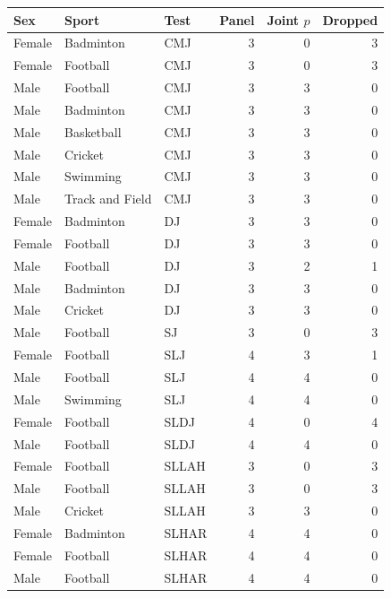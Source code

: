 \begin{tabular}{lllrrr}
\toprule
Sex & Sport & Test & Panel & Joint $p$ & Dropped \\
\midrule
Female & Badminton & CMJ & 3 & 0 & 3 \\
Female & Football & CMJ & 3 & 0 & 3 \\
Male & Football & CMJ & 3 & 3 & 0 \\
Male & Badminton & CMJ & 3 & 3 & 0 \\
Male & Basketball & CMJ & 3 & 3 & 0 \\
Male & Cricket & CMJ & 3 & 3 & 0 \\
Male & Swimming & CMJ & 3 & 3 & 0 \\
Male & Track and Field & CMJ & 3 & 3 & 0 \\
Female & Badminton & DJ & 3 & 3 & 0 \\
Female & Football & DJ & 3 & 3 & 0 \\
Male & Football & DJ & 3 & 2 & 1 \\
Male & Badminton & DJ & 3 & 3 & 0 \\
Male & Cricket & DJ & 3 & 3 & 0 \\
Male & Football & SJ & 3 & 0 & 3 \\
Female & Football & SLJ & 4 & 3 & 1 \\
Male & Football & SLJ & 4 & 4 & 0 \\
Male & Swimming & SLJ & 4 & 4 & 0 \\
Female & Football & SLDJ & 4 & 0 & 4 \\
Male & Football & SLDJ & 4 & 4 & 0 \\
Female & Football & SLLAH & 3 & 0 & 3 \\
Male & Football & SLLAH & 3 & 0 & 3 \\
Male & Cricket & SLLAH & 3 & 3 & 0 \\
Female & Badminton & SLHAR & 4 & 4 & 0 \\
Female & Football & SLHAR & 4 & 4 & 0 \\
Male & Football & SLHAR & 4 & 4 & 0 \\
\bottomrule
\end{tabular}
